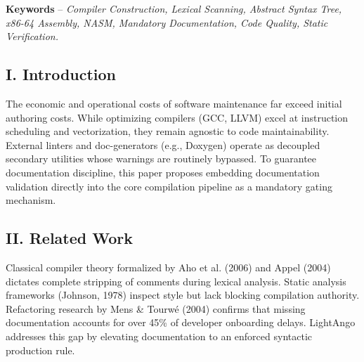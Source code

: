 \vspace{0.2cm}
\noindent
\textbf{Keywords} -- \textit{Compiler Construction, Lexical Scanning, Abstract Syntax Tree, x86-64 Assembly, NASM, Mandatory Documentation, Code Quality, Static Verification.}

\subsection*{I. Introduction}
The economic and operational costs of software maintenance far exceed initial authoring costs. While optimizing compilers (GCC, LLVM) excel at instruction scheduling and vectorization, they remain agnostic to code maintainability. External linters and doc-generators (e.g., Doxygen) operate as decoupled secondary utilities whose warnings are routinely bypassed. To guarantee documentation discipline, this paper proposes embedding documentation validation directly into the core compilation pipeline as a mandatory gating mechanism.

\subsection*{II. Related Work}
Classical compiler theory formalized by Aho et al. (2006) and Appel (2004) dictates complete stripping of comments during lexical analysis. Static analysis frameworks (Johnson, 1978) inspect style but lack blocking compilation authority. Refactoring research by Mens \& Tourwé (2004) confirms that missing documentation accounts for over 45\% of developer onboarding delays. LightAngo addresses this gap by elevating documentation to an enforced syntactic production rule.

